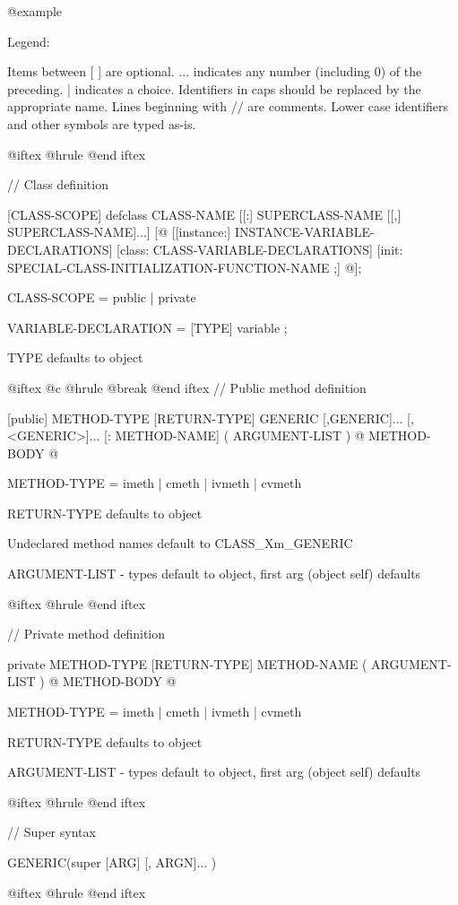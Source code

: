 @example

Legend:

        Items between [ ] are optional.
        ... indicates any number (including 0) of the preceding.
        | indicates a choice.
        Identifiers in caps should be replaced by the appropriate name.
        Lines beginning with // are comments.
        Lower case identifiers and other symbols are typed as-is.

@iftex
@hrule
@end iftex

// Class definition

[CLASS-SCOPE]  defclass  CLASS-NAME
        [[:]  SUPERCLASS-NAME  [[,] SUPERCLASS-NAME]...]
[@{
        [[instance:]
                INSTANCE-VARIABLE-DECLARATIONS]
        [class:
                CLASS-VARIABLE-DECLARATIONS]
        [init:
                SPECIAL-CLASS-INITIALIZATION-FUNCTION-NAME ;]
@}];


CLASS-SCOPE = public | private

VARIABLE-DECLARATION = [TYPE]  variable ;

TYPE defaults to object

@iftex
@c @hrule
@break
@end iftex
//  Public method definition 

[public]  METHOD-TYPE [RETURN-TYPE]  GENERIC [,GENERIC]...
        [,<GENERIC>]... [: METHOD-NAME]  ( ARGUMENT-LIST )
@{
        METHOD-BODY
@}

METHOD-TYPE = imeth | cmeth | ivmeth | cvmeth

RETURN-TYPE defaults to object

Undeclared method names default to CLASS_Xm_GENERIC

ARGUMENT-LIST - types default to object,
                first arg (object self) defaults

@iftex
@hrule
@end iftex

//  Private method definition 

private METHOD-TYPE [RETURN-TYPE]  METHOD-NAME
        ( ARGUMENT-LIST )
@{
        METHOD-BODY
@}

METHOD-TYPE = imeth | cmeth | ivmeth | cvmeth

RETURN-TYPE defaults to object

ARGUMENT-LIST - types default to object,
                first arg (object self) defaults

@iftex
@hrule
@end iftex

//  Super syntax

GENERIC(super [ARG]  [, ARGN]... )

@iftex
@hrule
@end iftex

